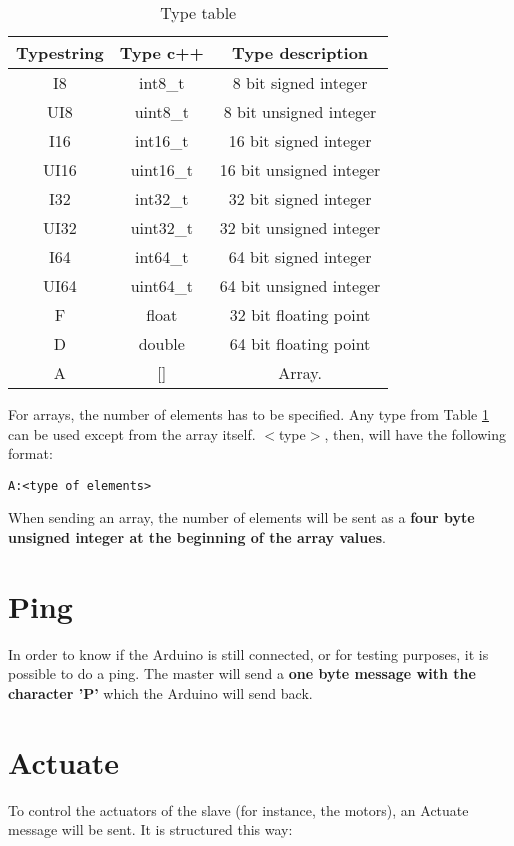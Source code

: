 \documentclass[11pt,a4paper,oneside]{book}
\begin{document}
\begin{table}
\label{tab:types}
\centering
\begin{tabular}{|c|c|c|}
\hline 
\textbf{Typestring} & \textbf{Type c++} & \textbf{ Type description} \\ 
\hline 
I8 & int8\_t & 8 bit signed integer \\ 
\hline 
UI8 & uint8\_t & 8 bit unsigned integer \\ 
\hline 
I16 & int16\_t & 16 bit signed integer \\ 
\hline 
UI16 & uint16\_t & 16 bit unsigned integer \\ 
\hline 
I32 & int32\_t & 32 bit signed integer \\ 
\hline 
UI32 & uint32\_t & 32 bit unsigned integer \\ 
\hline 
I64 & int64\_t & 64 bit signed integer \\ 
\hline 
UI64 & uint64\_t & 64 bit unsigned integer \\ 
\hline 
F & float & 32 bit floating point \\ 
\hline 
D & double & 64 bit floating point \\ 
\hline 
A & [] & Array. \\ 
\hline 
\end{tabular} 
\caption{Type table}
\end{table}

For arrays, the number of elements has to be specified. Any type from Table \ref{tab:types} can be used except from the array itself. $<$type$>$, then, will have the following format:

\begin{verbatim}
A:<type of elements>
\end{verbatim}

When sending an array, the number of elements will be sent as a \textbf{four byte unsigned integer at the beginning of the array values}.

\section{Ping}
In order to know if the Arduino is still connected, or for testing purposes, it is possible to do a ping.
The master will send a\textbf{ one byte message with the character 'P'} which the Arduino will send back.

\section{Actuate}
To control the actuators of the slave (for instance, the motors), an Actuate message will be sent. It is structured this way:
\end{document}

